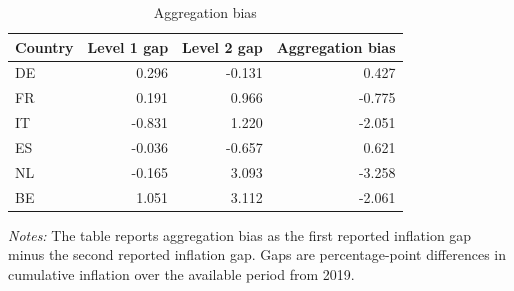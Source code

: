 \begin{table}

\caption{\label{tab:aggregation-bias-level1-level2}Aggregation bias}
\centering
\begin{tabular}[t]{lrrr}
\toprule
Country & Level 1 gap & Level 2 gap & Aggregation bias\\
\midrule
DE & 0.296 & -0.131 & 0.427\\
FR & 0.191 & 0.966 & -0.775\\
IT & -0.831 & 1.220 & -2.051\\
ES & -0.036 & -0.657 & 0.621\\
NL & -0.165 & 3.093 & -3.258\\
\addlinespace
BE & 1.051 & 3.112 & -2.061\\
\bottomrule
\end{tabular}
\end{table}
\begin{flushleft}
\footnotesize{\emph{Notes:} The table reports aggregation bias as the first reported inflation gap minus the second reported inflation gap. Gaps are percentage-point differences in cumulative inflation over the available period from 2019.}
\end{flushleft}
